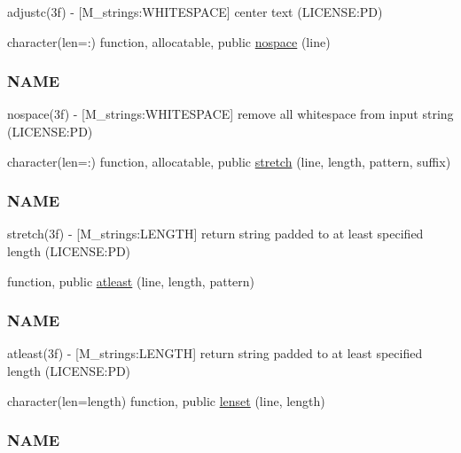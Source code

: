 \begin{DoxyCompactItemize}
\begin{DoxyCompactList}
adjustc(3f) -\/ \mbox{[}M\+\_\+strings\+:W\+H\+I\+T\+E\+S\+P\+A\+CE\mbox{]} center text (L\+I\+C\+E\+N\+SE\+:PD) \end{DoxyCompactList}\item 
character(len=\+:) function, allocatable, public \mbox{\hyperlink{namespacem__strings_ad007f050abe3d142f4a7badbc4408685}{nospace}} (line)
\begin{DoxyCompactList}\small\item\em \subsubsection*{N\+A\+ME}

nospace(3f) -\/ \mbox{[}M\+\_\+strings\+:W\+H\+I\+T\+E\+S\+P\+A\+CE\mbox{]} remove all whitespace from input string (L\+I\+C\+E\+N\+SE\+:PD) \end{DoxyCompactList}\item 
character(len=\+:) function, allocatable, public \mbox{\hyperlink{namespacem__strings_aa67b36ec70dbad84672d3069882929c5}{stretch}} (line, length, pattern, suffix)
\begin{DoxyCompactList}\small\item\em \subsubsection*{N\+A\+ME}

stretch(3f) -\/ \mbox{[}M\+\_\+strings\+:L\+E\+N\+G\+TH\mbox{]} return string padded to at least specified length (L\+I\+C\+E\+N\+SE\+:PD) \end{DoxyCompactList}\item 
function, public \mbox{\hyperlink{namespacem__strings_ab20ba3a07833232eb3c67d4020a7fe64}{atleast}} (line, length, pattern)
\begin{DoxyCompactList}\small\item\em \subsubsection*{N\+A\+ME}

atleast(3f) -\/ \mbox{[}M\+\_\+strings\+:L\+E\+N\+G\+TH\mbox{]} return string padded to at least specified length (L\+I\+C\+E\+N\+SE\+:PD) \end{DoxyCompactList}\item 
character(len=length) function, public \mbox{\hyperlink{namespacem__strings_a378563bb49f128bf0cf9c9d2b1f34498}{lenset}} (line, length)
\begin{DoxyCompactList}\small\item\em \subsubsection*{N\+A\+ME}


\end{DoxyCompactList}
\end{DoxyCompactItemize}
